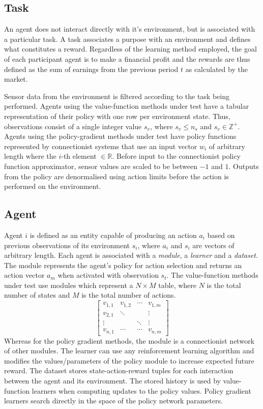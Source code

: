 \subsection{Task}
An agent does not interact directly with it's environment, but is associated
with a particular task.  A task associates a purpose with an environment and
defines what constitutes a reward.  Regardless of the learning method employed,
the goal of each participant agent is to make a financial profit and the
rewards are thus defined as the sum of earnings from the previous period $t$
as calculated by the market.

Sensor data from the environment is filtered according to the task being
performed.  Agents using the value-function methods under test have a tabular
representation of their policy with one row per environment state.  Thus,
observations consist of a single integer value $s_v$, where $s_v \leq n_s$ and
$s_v \in \mathbb{Z}^+$.  Agents using the policy-gradient methods under test
have policy functions represented by connectionist systems that use an input
vector $w_i$ of arbitrary length where the $i$-th element $\in \mathbb{R}$.
Before input to the connectionist policy function approximator, sensor values
are scaled to be between $-1$ and $1$. Outputs from the policy are
denormalised using action limits before the action is performed on the
environment.

\subsection{Agent}
Agent $i$ is defined as an entity capable of producing an action $a_i$
based on previous observations of its environment $s_i$, where $a_i$ and $s_i$
are vectors of arbitrary length.  Each agent is associated with a
\textit{module}, a \textit{learner} and a \textit{dataset}. The module
represents the agent's policy for action selection and returns an action
vector $a_m$ when activated with observation $s_t$.  The value-function
methods under test use modules which represent a $N \times M$ table, where $N$
is the total number of states and $M$ is the total number of actions.
\begin{equation}
\begin{bmatrix}
v_{1,1}& v_{1,2}& \dotsb& v_{1,m}\\
v_{2,1}& \ddots& & \vdots\\
\vdots& &\ddots& \vdots\\
v_{n,1}& \dotsb& \dotsb& v_{n,m}
\end{bmatrix}
\end{equation}
Whereas for the policy gradient methods, the module is a connectionist network
of other modules.  The learner can use any
reinforcement learning algorithm and modifies the values/parameters of the
policy module to increase expected future reward.  The dataset stores
state-action-reward tuples for each interaction between the agent and its
environment.  The stored history is used by value-function learners when
computing updates to the policy values.  Policy gradient learners search
directly in the space of the policy network parameters.

